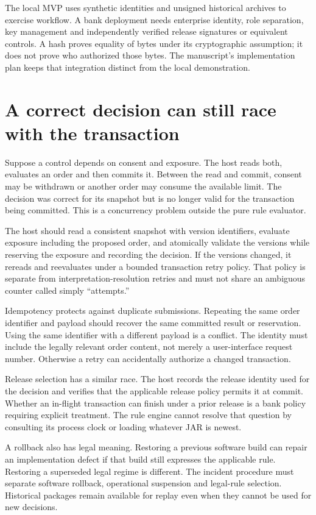 The local MVP uses synthetic identities and unsigned historical archives to
exercise workflow. A bank deployment needs enterprise identity, role separation,
key management and independently verified release signatures or equivalent
controls. A hash proves equality of bytes under its cryptographic assumption;
it does not prove who authorized those bytes. The manuscript's implementation
plan keeps that integration distinct from the local demonstration.

\section{A correct decision can still race with the transaction}

Suppose a control depends on consent and exposure. The host reads both, evaluates
an order and then commits it. Between the read and commit, consent may be
withdrawn or another order may consume the available limit. The decision was
correct for its snapshot but is no longer valid for the transaction being
committed. This is a concurrency problem outside the pure rule evaluator.

The host should read a consistent snapshot with version identifiers, evaluate
exposure including the proposed order, and atomically validate the versions while
reserving the exposure and recording the decision. If the versions changed, it
rereads and reevaluates under a bounded transaction retry policy. That policy is
separate from interpretation-resolution retries and must not share an ambiguous
counter called simply ``attempts.''

Idempotency protects against duplicate submissions. Repeating the same order
identifier and payload should recover the same committed result or reservation.
Using the same identifier with a different payload is a conflict. The identity
must include the legally relevant order content, not merely a user-interface
request number. Otherwise a retry can accidentally authorize a changed transaction.

Release selection has a similar race. The host records the release identity used
for the decision and verifies that the applicable release policy permits it at
commit. Whether an in-flight transaction can finish under a prior release is a
bank policy requiring explicit treatment. The rule engine cannot resolve that
question by consulting its process clock or loading whatever JAR is newest.

A rollback also has legal meaning. Restoring a previous software build can repair
an implementation defect if that build still expresses the applicable rule.
Restoring a superseded legal regime is different. The incident procedure must
separate software rollback, operational suspension and legal-rule selection.
Historical packages remain available for replay even when they cannot be used for
new decisions.

